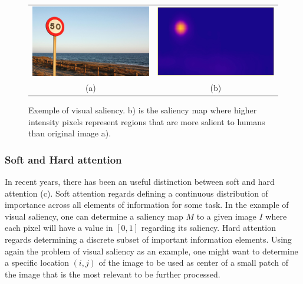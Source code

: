 \documentclass[article]{IEEEtran}
\begin{document}
\begin{figure}
\begin{center}
		\begin{tabular} {cc}
		\includegraphics[width=0.45\linewidth]{./img/traffic_sign_s.jpg} &
		\includegraphics[width=0.45\linewidth]{./img/traffic_sign_m.jpg}\\
        (a) & (b)
		\end{tabular}
\caption{Exemple of visual saliency.
    b) is the saliency map where higher intensity pixels represent
    regions that are more salient to humans than original image a).}
\label{fig:saliency}
\end{center}
\end{figure}

\subsubsection{Soft and Hard attention}
In recent years, there has been an useful distinction between
soft and hard attention (c).
Soft attention regards defining a continuous distribution of importance
across all elements of information for some task.
In the example of visual saliency, one can determine a saliency map $M$
to a given image $I$ where each pixel will have a value in $[0, 1]$
regarding its saliency.
Hard attention regards determining a discrete subset of
important information elements.
Using again the problem of visual saliency as an example,
one might want to determine a specific location $(i, j)$ of the image
to be used as center of a small patch of the image that is the most
relevant to be further processed.
\end{document}
